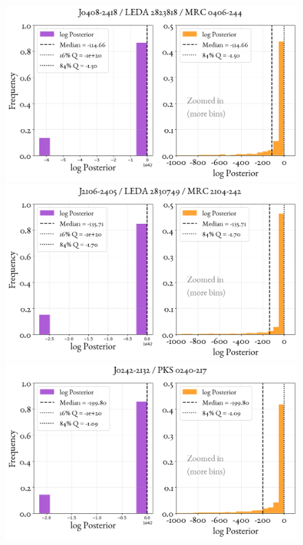 \begin{figure}
    \centering
    \includegraphics[width=0.8\linewidth]{figures/ResultPosteriors/114_Posterior_5353.png}\\
     \includegraphics[width=0.8\linewidth]{figures/ResultPosteriors/115_Posterior_5355.png}\\
      \includegraphics[width=0.8\linewidth]{figures/ResultPosteriors/116_Posterior_6000.png}  
\end{figure}


